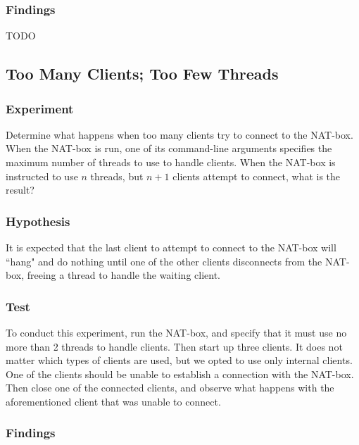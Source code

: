 \documentclass[10pt, a4paper]{article}
\begin{document}
\subsubsection{Findings}
\label{sssec:dupfind}

TODO


\subsection{Too Many Clients; Too Few Threads}
\label{ssec:toomany}


\subsubsection{Experiment}
\label{sssec:toomanyexp}

Determine what happens when too many clients try to connect to the NAT-box. When
the NAT-box is run, one of its command-line arguments specifies the maximum
number of threads to use to handle clients. When the NAT-box is instructed to
use $n$ threads, but $n + 1$ clients attempt to connect, what is the result?


\subsubsection{Hypothesis}
\label{sssec:toomanyhyp}

It is expected that the last client to attempt to connect to the NAT-box will
``hang" and do nothing until one of the other clients disconnects from the
NAT-box, freeing a thread to handle the waiting client.


\subsubsection{Test}
\label{sssec:toomanytest}

To conduct this experiment, run the NAT-box, and specify that it must use no
more than 2 threads to handle clients. Then start up three clients. It does not
matter which types of clients are used, but we opted to use only internal
clients. One of the clients should be unable to establish a connection with the
NAT-box. Then close one of the connected clients, and observe what happens with
the aforementioned client that was unable to connect.


\subsubsection{Findings}
\label{sssec:toomanyfind}
\end{document}
